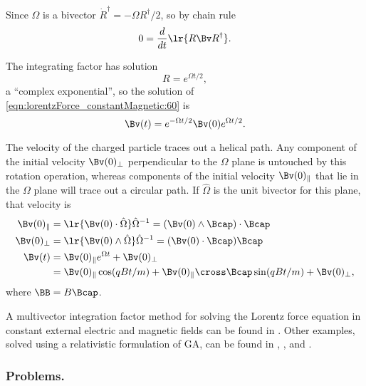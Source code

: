 Since \( \Omega \) is a bivector \( \dot{R}^\dagger = -\Omega R^\dagger/2 \), so by chain rule
\begin{equation}\label{eqn:lorentzForce_constantMagnetic:160}
0 = \frac{d}{dt} \lr{ R \Bv R^\dagger }.
\end{equation}

The integrating factor has solution
\begin{equation}\label{eqn:lorentzForce_constantMagnetic:180}
R = e^{\Omega t/2},
\end{equation}
a ``complex exponential'', so the solution of \cref{eqn:lorentzForce_constantMagnetic:60} is
\begin{equation}\label{eqn:lorentzForce_constantMagnetic:200}
\Bv(t) = e^{-\Omega t/2} \Bv(0) e^{\Omega t/2}.
\end{equation}

The velocity of the charged particle traces out a helical path.
Any component of the initial velocity \( \Bv(0)_\perp \) perpendicular to the \( \Omega \) plane is untouched by this rotation operation, whereas components of the initial velocity \( \Bv(0)_\parallel \) that lie in the \( \Omega \) plane will trace out a circular path.
If \( \hat{\Omega} \) is the unit bivector for this plane, that velocity is
\begin{equation}\label{eqn:lorentzForce_constantMagnetic:220}
\begin{aligned}
\Bv(0)_\parallel &= \lr{ \Bv(0) \cdot \hat{\Omega} } \hat{\Omega}^{-1}
                  = (\Bv(0) \wedge \Bcap) \cdot \Bcap \\
\Bv(0)_\perp &= \lr{ \Bv(0) \wedge \hat{\Omega} } \hat{\Omega}^{-1}
              = (\Bv(0) \cdot \Bcap) \Bcap \\
\Bv(t) &=
\Bv(0)_\parallel e^{\Omega t} + \Bv(0)_\perp \\
       &=
\Bv(0)_\parallel \cos( q B t/ m )
+
\Bv(0)_\parallel \cross \Bcap \sin( q B t/ m )
+ \Bv(0)_\perp,
\end{aligned}
\end{equation}
where \( \BB = B \Bcap \).

A multivector integration factor method for solving the Lorentz force equation in constant external electric and magnetic fields can be found in \citep{hestenes1999nfc}.  Other examples, solved using a relativistic formulation of GA, can be found in \citep{doran2003gap},
\citep{hestenes1974properdynamics}, and
\citep{hestenes1974propermechanics}.

\subsubsection{Problems.}
